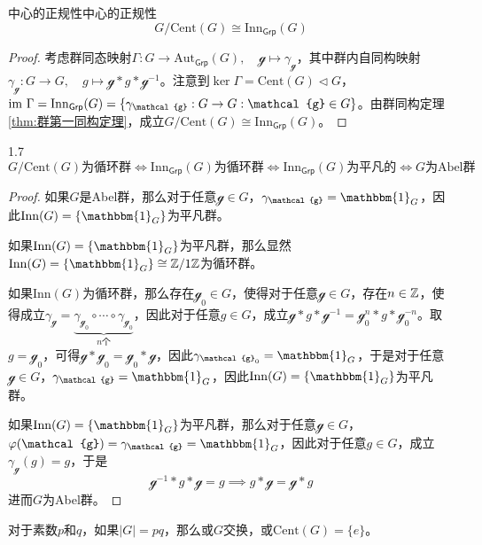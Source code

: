 \begin{proposition}{中心的正规性}{中心的正规性}
	$$
	G/\mathrm{Cent}(G)\cong \mathrm{Inn}_{\mathsf{Grp}}(G)
	$$	
\end{proposition}

\begin{proof}
	考虑群同态映射$\Gamma:G\to \mathrm{Aut}_{\mathsf{Grp}}(G),\quad \mathcal{g}\mapsto \gamma_{\mathcal{g}}$，其中群内自同构映射$\gamma_{\mathcal{g}}:G\to G,\quad g\mapsto \mathcal{g}* g *\mathcal{g}^{-1}$。注意到$\ker \Gamma=\mathrm{Cent}(G)\lhd G$，$\im \Gamma=\mathrm{Inn}_{\mathsf{Grp}}(G)=\{ \gamma_\mathcal{g}:G\to G:\mathcal{g}\in G \}$。由群同构定理\ref{thm:群第一同构定理}，成立$G/\mathrm{Cent}(G)\cong \mathrm{Inn}_{\mathsf{Grp}}(G)$。
\end{proof}

\begin{proposition}{}{1.7}
	$$
	G/\mathrm{Cent}(G)\text{为循环群}\iff
	\mathrm{Inn}_{\mathsf{Grp}}(G)\text{为循环群}\iff
	\mathrm{Inn}_{\mathsf{Grp}}(G)\text{为平凡的}\iff
	G\text{为Abel群}
	$$
\end{proposition}

\begin{proof}
	如果$G$是Abel群，那么对于任意$\mathcal{g}\in G$，$\gamma_\mathcal{g}=\mathbbm{1}_G$，因此$\mathrm{Inn}(G)=\{ \mathbbm{1}_G \}$为平凡群。
	
	如果$\mathrm{Inn}(G)=\{ \mathbbm{1}_G \}$为平凡群，那么显然$\mathrm{Inn}(G)=\{ \mathbbm{1}_G \}\cong\Z/1\Z$为循环群。
	
	如果$\mathrm{Inn}(G)$为循环群，那么存在$\mathcal{g}_0\in G$，使得对于任意$\mathcal{g}\in G$，存在$n\in\mathbb{Z}$，使得成立$\gamma_\mathcal{g}=\underbrace{\gamma_{\mathcal{g}_0}\circ\cdots\circ\gamma_{\mathcal{g}_0}}_{n\text{个}}$，因此对于任意$g\in G$，成立$\mathcal{g}*g*\mathcal{g}^{-1}=\mathcal{g}_0^n*g*\mathcal{g}_0^{-n}$。取$g=\mathcal{g}_0$，可得$\mathcal{g}*\mathcal{g}_0=\mathcal{g}_0*\mathcal{g}$，因此$\gamma_{\mathcal{g}_0}=\mathbbm{1}_G$，于是对于任意$\mathcal{g}\in G$，$\gamma_{\mathcal{g}}=\mathbbm{1}_G$，因此$\mathrm{Inn}(G)=\{ \mathbbm{1}_G \}$为平凡群。
	
	如果$\mathrm{Inn}(G)=\{ \mathbbm{1}_G \}$为平凡群，那么对于任意$\mathcal{g}\in G$，$\varphi(\mathcal{g})=\gamma_{\mathcal{g}}=\mathbbm{1}_G$，因此对于任意$g\in G$，成立$\gamma_{\mathcal{g}}(g)=g$，于是
	$$
	\mathcal{g}^{-1}*g*\mathcal{g}=g\implies g*\mathcal{g}=\mathcal{g}*g
	$$
	进而$G$为Abel群。
\end{proof}

\begin{proposition}
	对于素数$p$和$q$，如果$|G|=pq$，那么或$G$交换，或$\mathrm{Cent}(G)=\{e\}$。
\end{proposition}

